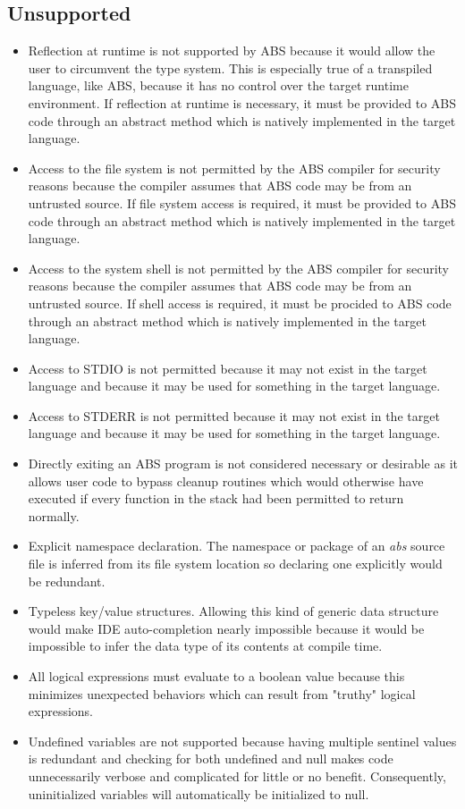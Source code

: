 \documentclass[hidelinks]{article}
\begin{document}
\subsection{Unsupported}
\begin{itemize}
\item Reflection at runtime is not supported by ABS because it would allow the user to circumvent the type system. This is especially true of a transpiled language, like ABS, because it has no control over the target runtime environment. If reflection at runtime is necessary, it must be provided to ABS code through an abstract method which is natively implemented in the target language.
\item Access to the file system is not permitted by the ABS compiler for security reasons because the compiler assumes that ABS code may be from an untrusted source. If file system access is required, it must be provided to ABS code through an abstract method which is natively implemented in the target language.
\item Access to the system shell is not permitted by the ABS compiler for security reasons because the compiler assumes that ABS code may be from an untrusted source. If shell access is required, it must be procided to ABS code through an abstract method which is natively implemented in the target language.
\item Access to STDIO is not permitted because it may not exist in the target language and because it may be used for something in the target language.
\item Access to STDERR is not permitted because it may not exist in the target language and because it may be used for something in the target language.
\item Directly exiting an ABS program is not considered necessary or desirable as it allows user code to bypass cleanup routines which would otherwise have executed if every function in the stack had been permitted to return normally.
\item Explicit namespace declaration. The namespace or package of an \textit{abs} source file is inferred from its file system location so declaring one explicitly would be redundant. 
\item Typeless key/value structures. Allowing this kind of generic data structure would make IDE auto-completion nearly impossible because it would be impossible to infer the data type of its contents at compile time.
\item All logical expressions must evaluate to a boolean value because this minimizes unexpected behaviors which can result from "truthy" logical expressions.
\item Undefined variables are not supported because having multiple sentinel values is redundant and checking for both undefined and null makes code unnecessarily verbose and complicated for little or no benefit. Consequently, uninitialized variables will automatically be initialized to null.
\end{itemize}
\end{document}
